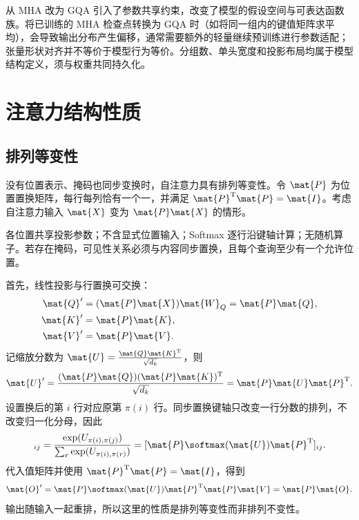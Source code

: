 \documentclass[../textbook.tex]{subfiles}
\begin{document}
从 MHA 改为 GQA 引入了参数共享约束，改变了模型的假设空间与可表达函数族。将已训练的 MHA 检查点转换为 GQA 时（如将同一组内的键值矩阵求平均），会导致输出分布产生偏移，通常需要额外的轻量继续预训练进行参数适配；张量形状对齐并不等价于模型行为等价。分组数、单头宽度和投影布局均属于模型结构定义，须与权重共同持久化。

\section{注意力结构性质}

\subsection{排列等变性}
没有位置表示、掩码也同步变换时，自注意力具有排列等变性。令 $\mat{P}$ 为位置置换矩阵，每行每列恰有一个一，并满足 $\mat{P}^{\mathrm{T}}\mat{P}=\mat{I}$。考虑自注意力输入 $\mat{X}$ 变为 $\mat{P}\mat{X}$ 的情形。

\begin{assumption}[排列等变性证明的前提]
各位置共享投影参数；不含显式位置输入；Softmax 逐行沿键轴计算；无随机算子。若存在掩码，可见性关系必须与内容同步置换，且每个查询至少有一个允许位置。
\end{assumption}

首先，线性投影与行置换可交换：
\begin{equation}
 \begin{aligned}
  \mat{Q}'&=(\mat{P}\mat{X})\mat{W}_Q=\mat{P}\mat{Q},\\
  \mat{K}'&=\mat{P}\mat{K},\\
  \mat{V}'&=\mat{P}\mat{V}.
 \end{aligned}
\end{equation}
记缩放分数为 $\mat{U}=\frac{\mat{Q}\mat{K}^{\mathrm{T}}}{\sqrt{d_k}}$，则
\begin{equation}
 \mat{U}'=\frac{(\mat{P}\mat{Q})(\mat{P}\mat{K})^{\mathrm{T}}}{\sqrt{d_k}}=\mat{P}\mat{U}\mat{P}^{\mathrm{T}}.
\end{equation}
设置换后的第 $i$ 行对应原第 $\pi(i)$ 行。同步置换键轴只改变一行分数的排列，不改变归一化分母，因此
\begin{equation}
 [\softmax(\mat{U}')]_{ij}
 =\frac{\exp(U_{\pi(i),\pi(j)})}{\sum_r\exp(U_{\pi(i),\pi(r)})}
 =[\mat{P}\softmax(\mat{U})\mat{P}^{\mathrm{T}}]_{ij}.
\end{equation}
代入值矩阵并使用 $\mat{P}^{\mathrm{T}}\mat{P}=\mat{I}$，得到
\begin{equation}
 \mat{O}'=\mat{P}\softmax(\mat{U})\mat{P}^{\mathrm{T}}\mat{P}\mat{V}=\mat{P}\mat{O}.
\end{equation}
输出随输入一起重排，所以这里的性质是排列等变性而非排列不变性。
\end{document}
